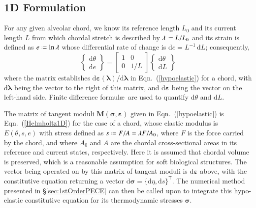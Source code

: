 \subsection{1D Formulation}

For any given alveolar chord, we know its reference length $L_0$ and its current length $L$ from which chordal stretch is described by $\lambda \defeq L / L_0$ and its strain is defined as $e \defeq \ln \lambda$ whose differential rate of change is $\mathrm{d} e = L^{-1} \, \mathrm{d} L$; consequently,
\begin{equation}
    \left\{ \begin{matrix}
    \mathrm{d} \theta \\ \mathrm{d} e
    \end{matrix} \right\} = \begin{bmatrix}
    1 & 0 \\ 0 & 1/L
    \end{bmatrix} \left\{ \begin{matrix}
    \mathrm{d} \theta \\ \mathrm{d} L
    \end{matrix} \right\}
\end{equation}
where the matrix establishes $\mathrm{d} \boldsymbol{\varepsilon} ( \boldsymbol{\lambda} ) / \mathrm{d} \boldsymbol{\lambda}$ in Eqn.~(\ref{hypoelastic}) for a chord, with $\mathrm{d} \boldsymbol{\lambda}$ being the vector to the right of this matrix, and $\mathrm{d} \boldsymbol{\varepsilon}$ being the vector on the left-hand side.  Finite difference formul\ae\ are used to quantify $\mathrm{d} \theta$ and $\mathrm{d} L$.

The matrix of tangent moduli $\mathbf{M} ( \boldsymbol{\sigma} , \boldsymbol{\varepsilon} )$ given in Eqn.~(\ref{hypoelastic}) is Eqn.~(\ref{Helmholtz1D}) for the case of a chord, whose elastic modulus is $E(\theta , s , e)$ with stress defined as $s \defeq F/A = \lambda F / A_0$, where $F$ is the force carried by the chord, and where $A_0$ and $A$ are the chordal cross-sectional areas in its reference and current states, respectively.  Here it is assumed that chordal volume is preserved, which is a reasonable assumption for soft biological structures.  The vector being operated on by this matrix of tangent moduli is $\mathrm{d} \boldsymbol{\varepsilon}$ above, with the constitutive equation returning a vector $\mathrm{d} \boldsymbol{\sigma} = \{ \mathrm{d} \eta , \mathrm{d} s \}^{\mathsf{T}}$.  The numerical method presented in \S\ref{sec:1stOrderPECE} can then be called upon to integrate this hypo-elastic constitutive equation for its thermo\-dynamic stresses $\boldsymbol{\sigma}$.  


